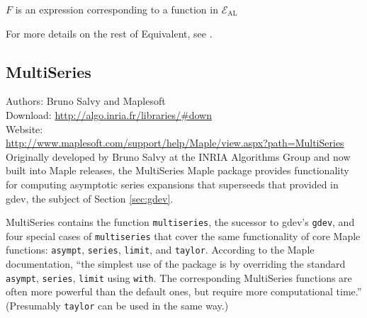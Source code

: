 \documentclass[12pt]{article}
\theoremstyle{plain}
\begin{document}
\begin{center}
\begin{algorithmic}
\Require \( F \) is an expression corresponding to a function in \( \mathscr{E}_{\text{AL}} \)




\EndIf
\end{algorithmic}
\end{center}
For more details on the rest of Equivalent, see \cite{assistant}.


\subsection{MultiSeries}
\label{sec:multiseries}

Authors: Bruno Salvy and Maplesoft
\\
Download: \url{http://algo.inria.fr/libraries/\#down}
\\
Website: \\
\indent \url{http://www.maplesoft.com/support/help/Maple/view.aspx?path=MultiSeries}
\\

Originally developed by Bruno Salvy at the INRIA Algorithms Group and now built into Maple releases,
the MultiSeries Maple package provides functionality for computing asymptotic series expansions that superseeds that provided in gdev, the subject of Section \ref{sec:gdev}.

MultiSeries contains the function \texttt{multiseries}, the sucessor to gdev's \texttt{gdev}, and four special cases of \texttt{multiseries} that cover the same functionality of core Maple functions: \texttt{asympt}, \texttt{series}, \texttt{limit}, and \texttt{taylor}.
According to the Maple documentation, ``the simplest use of the package is by overriding the standard \texttt{asympt}, \texttt{series}, \texttt{limit} using \texttt{with}. The corresponding MultiSeries functions are often more powerful than the default ones, but require more computational time.''
(Presumably \texttt{taylor} can be used in the same way.)
\end{document}
